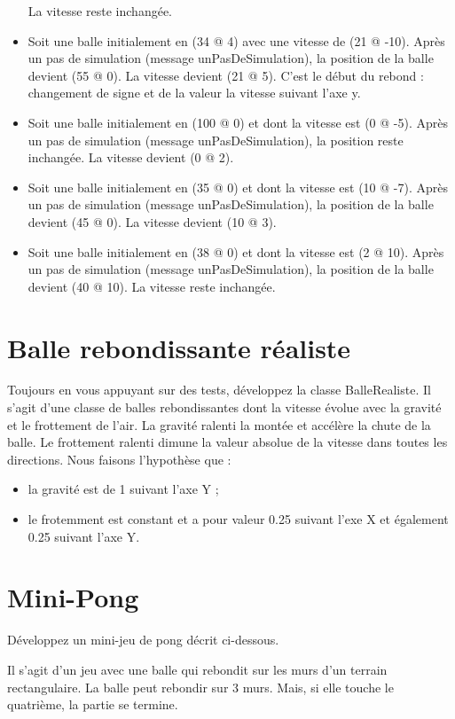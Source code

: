 \documentclass[12pt]{article}
\begin{document}
\begin{itemize}
	La vitesse reste inchangée.
	\item Soit une balle initialement en {\sf (34 @ 4)} avec une vitesse de {\sf (21 @ -10)}.
	Après un pas de simulation (message {\sf unPasDeSimulation}), la position de la balle devient  {\sf (55 @ 0)}. 
	La vitesse devient {\sf (21 @ 5)}. C'est le début du rebond : changement de signe et de la valeur la vitesse suivant l'axe y.
	\item Soit une balle initialement en {\sf (100 @ 0)} et dont la vitesse est {\sf (0 @ -5)}. 
	Après un pas de simulation (message {\sf unPasDeSimulation}), la position reste inchangée.
	La vitesse devient {\sf (0 @ 2)}.
	\item Soit une balle initialement en {\sf (35 @ 0)} et dont la vitesse est {\sf (10 @ -7)}. 
	Après un pas de simulation (message {\sf unPasDeSimulation}), la position de la balle devient  {\sf (45 @ 0)}. La vitesse devient {\sf (10 @ 3)}.
	\item Soit une balle initialement en {\sf (38 @ 0)} et dont la vitesse est {\sf (2 @ 10)}. 
	Après un pas de simulation (message {\sf unPasDeSimulation}), la position de la balle devient  {\sf (40 @ 10)}. La vitesse reste inchangée.

\end{itemize}

\section{Balle rebondissante réaliste}
Toujours en vous appuyant sur des tests, développez la classe {\sf BalleRealiste}. Il s'agit d'une classe de balles rebondissantes dont la vitesse évolue avec la gravité et le frottement de l'air. 
La gravité ralenti la montée et accélère la chute de la balle.
Le frottement ralenti dimune la valeur absolue de la vitesse dans toutes les directions.
Nous faisons l'hypothèse que :
\begin{itemize}
	\item la gravité est de 1 suivant l'axe Y ;
	\item le frotemment est constant et a pour valeur 0.25 suivant l'exe X et également 0.25 suivant l'axe Y.
\end{itemize}

\section{Mini-Pong}
Développez un mini-jeu de pong décrit ci-dessous.
 
Il s'agit d'un jeu avec une balle qui rebondit sur les murs d'un terrain rectangulaire.
La balle peut rebondir sur 3 murs.
Mais, si elle touche le quatrième, la partie se termine.
\end{document}
